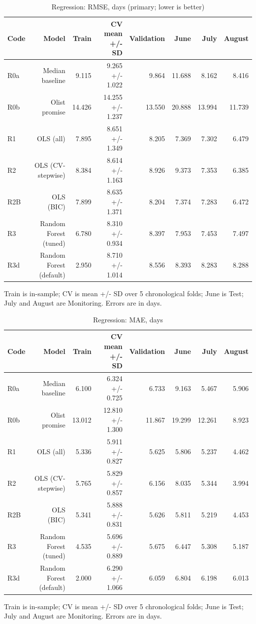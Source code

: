 \begin{table}[htbp]
\centering
\small
\caption{Regression: RMSE, days (primary; lower is better)}
\begin{tabular}{lrrrrrrr}
\toprule
Code & Model & Train & CV mean +/- SD & Validation & June & July & August \\
\midrule
R0a & Median baseline & 9.115 & 9.265 +/- 1.022 & 9.864 & 11.688 & 8.162 & 8.416 \\
R0b & Olist promise & 14.426 & 14.255 +/- 1.237 & 13.550 & 20.888 & 13.994 & 11.739 \\
R1 & OLS (all) & 7.895 & 8.651 +/- 1.349 & 8.205 & 7.369 & 7.302 & 6.479 \\
R2 & OLS (CV-stepwise) & 8.384 & 8.614 +/- 1.163 & 8.926 & 9.373 & 7.353 & 6.385 \\
R2B & OLS (BIC) & 7.899 & 8.635 +/- 1.371 & 8.204 & 7.374 & 7.283 & 6.472 \\
R3 & Random Forest (tuned) & 6.780 & 8.310 +/- 0.934 & 8.397 & 7.953 & 7.453 & 7.497 \\
R3d & Random Forest (default) & 2.950 & 8.710 +/- 1.014 & 8.556 & 8.393 & 8.283 & 8.288 \\
\bottomrule
\end{tabular}
\par\smallskip\begin{minipage}{\linewidth}\footnotesize Train is in-sample; CV is mean +/- SD over 5 chronological folds; June is Test; July and August are Monitoring. Errors are in days.\end{minipage}
\end{table}


\begin{table}[htbp]
\centering
\small
\caption{Regression: MAE, days}
\begin{tabular}{lrrrrrrr}
\toprule
Code & Model & Train & CV mean +/- SD & Validation & June & July & August \\
\midrule
R0a & Median baseline & 6.100 & 6.324 +/- 0.725 & 6.733 & 9.163 & 5.467 & 5.906 \\
R0b & Olist promise & 13.012 & 12.810 +/- 1.300 & 11.867 & 19.299 & 12.261 & 8.923 \\
R1 & OLS (all) & 5.336 & 5.911 +/- 0.827 & 5.625 & 5.806 & 5.237 & 4.462 \\
R2 & OLS (CV-stepwise) & 5.765 & 5.829 +/- 0.857 & 6.156 & 8.035 & 5.344 & 3.994 \\
R2B & OLS (BIC) & 5.341 & 5.888 +/- 0.831 & 5.626 & 5.811 & 5.219 & 4.453 \\
R3 & Random Forest (tuned) & 4.535 & 5.696 +/- 0.889 & 5.675 & 6.447 & 5.308 & 5.187 \\
R3d & Random Forest (default) & 2.000 & 6.290 +/- 1.066 & 6.059 & 6.804 & 6.198 & 6.013 \\
\bottomrule
\end{tabular}
\par\smallskip\begin{minipage}{\linewidth}\footnotesize Train is in-sample; CV is mean +/- SD over 5 chronological folds; June is Test; July and August are Monitoring. Errors are in days.\end{minipage}
\end{table}


